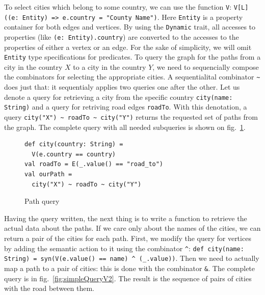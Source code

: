 To select cities which belong to some country, we can use the function \lstinline{V}: \lstinline{V[L]((e: Entity) => e.country = "County Name")}.
Here \lstinline{Entity} is a property container for both edges and vertices. 
By using the \lstinline{Dynamic} trait, all accesses to properties (like \lstinline{(e: Entity).country}) are converted to the accesses to the properties of either a vertex or an edge.
For the sake of simplicity, we will omit \lstinline{Entity} type specifications for predicates. 
To query the graph for the paths from a city in the country $X$ to a city in the country $Y$, we need to sequencially compose the combinators for selecting the appropriate cities. 
A sequentialital combinator \lstinline{~} does just that: it sequentialy applies two queries one after the other. 
Let us denote a query for retrieving a city from the specific country \lstinline{city(name: String)} and a query for retriving road edges \lstinline{roadTo}. 
With this denotation, a query \lstinline{city("X") ~ roadTo ~ city("Y")} returns the requested set of paths from the graph.
The complete query with all needed subqueries is shown on fig.~\ref{fig:simpleQuery}.

\begin{figure}[h]
\begin{lstlisting}
def city(country: String) =
  V(e.country == country)
val roadTo = E(_.value() == "road_to")
val ourPath = 
  city("X") ~ roadTo ~ city("Y")
\end{lstlisting}
\caption{Path query}
\label{fig:simpleQuery}
\end{figure}

Having the query written, the next thing is to write a function to retrieve the actual data about the paths.
If we care only about the names of the cities, we can return a pair of the cities for each path.
First, we modify the query for vertices by adding the semantic action to it using the combinator \lstinline{^}: \lstinline{def city(name: String) = syn(V(e.value() == name) ^ (_.value))}.
Then we need to actually map a path to a pair of cities: this is done with the combinator \lstinline{&}.
The complete query is in fig.~\ref{fig:simpleQueryV2}.
The result is the sequence of pairs of cities with the road between them.


